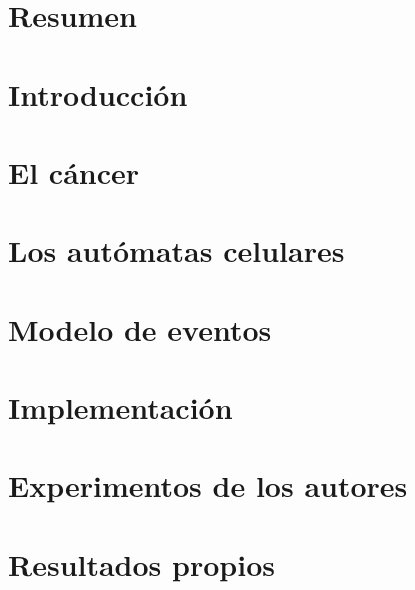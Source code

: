 \documentclass[titlepage,openright,twoside,a4paper,final,12pt]{book}
\author{Sergio Rodríguez Calvo}{D.~}{XXXXXXXXL}
\begin{document}
	\makeTitlePage

	\pagestyle{empty}
	\pagestyle{trinidadPhD}

	\tableofcontents
	\listoffigures

    \chapter{Resumen}
		

		\chapter{Introducción}
		

		\chapter{El cáncer}
		

		\chapter{Los autómatas celulares}
		

		\chapter{Modelo de eventos}
		

		\chapter{Implementación}
		

		\chapter{Experimentos de los autores}
		

		\chapter{Resultados propios}
		
        
\end{document}

